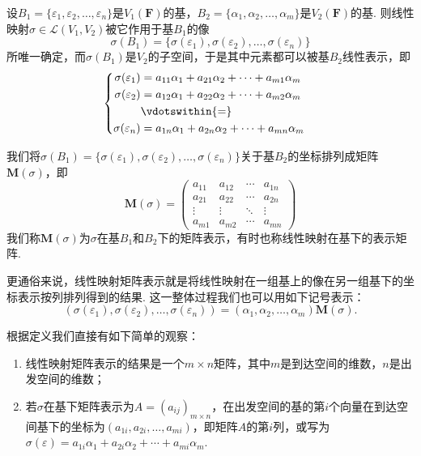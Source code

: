 \begin{definition}\label{def:7:线性映射矩阵表示}
    设$B_1=\{\varepsilon_1,\varepsilon_2,\ldots,\varepsilon_n\}$是$V_1(\mathbf{F})$的基，$B_2=\{\alpha_1,\alpha_2,\ldots,\alpha_m\}$是$V_2(\mathbf{F})$的基. 则线性映射$\sigma \in \mathcal{L}(V_1,V_2)$被它作用于基$B_1$的像
    \[\sigma(B_1)=\{\sigma(\varepsilon_1),\sigma(\varepsilon_2),\ldots,\sigma(\varepsilon_n)\}\]
    所唯一确定，而$\sigma(B_1)$是$V_2$的子空间，于是其中元素都可以被基$B_2$线性表示，即
    \[ \begin{cases} \begin{aligned}
                \sigma(\varepsilon_1) & = a_{11}\alpha_1+a_{21}\alpha_2+\cdots+a_{m1}\alpha_m \\
                \sigma(\varepsilon_2) & = a_{12}\alpha_1+a_{22}\alpha_2+\cdots+a_{m2}\alpha_m \\
                                      & \vdotswithin{=}                                       \\
                \sigma(\varepsilon_n) & = a_{1n}\alpha_1+a_{2n}\alpha_2+\cdots+a_{mn}\alpha_m
            \end{aligned} \end{cases} \]

    我们将$\sigma(B_1)=\{\sigma(\varepsilon_1),\sigma(\varepsilon_2),\ldots,\sigma(\varepsilon_n)\}$关于基$B_2$的坐标排列成矩阵$\mathbf{M}(\sigma)$，即
    \[\mathbf{M}(\sigma)=\begin{pmatrix}
            a_{11} & a_{12} & \cdots & a_{1n} \\
            a_{21} & a_{22} & \cdots & a_{2n} \\
            \vdots & \vdots & \ddots & \vdots \\
            a_{m1} & a_{m2} & \cdots & a_{mn}
        \end{pmatrix}\]
    我们称$\mathbf{M}(\sigma)$为$\sigma$在基$B_1$和$B_2$下的矩阵表示，有时也称线性映射在基下的表示矩阵.
\end{definition}

更通俗来说，线性映射矩阵表示就是将线性映射在一组基上的像在另一组基下的坐标表示按列排列得到的结果. 这一整体过程我们也可以用如下记号表示：
\begin{equation}\label{eq:7:线性映射矩阵表示}
    (\sigma(\varepsilon_1),\sigma(\varepsilon_2),\ldots,\sigma(\varepsilon_n))=(\alpha_1,\alpha_2,\ldots,\alpha_m)\mathbf{M}(\sigma).
\end{equation}

根据定义我们直接有如下简单的观察：
\begin{enumerate}
    \item 线性映射矩阵表示的结果是一个$m\times n$矩阵，其中$m$是到达空间的维数，$n$是出发空间的维数；

    \item 若$\sigma$在基下矩阵表示为$A=(a_{ij})_{m\times n}$，在出发空间的基的第$i$个向量在到达空间基下的坐标为$(a_{1i},a_{2i},\ldots,a_{mi})$，即矩阵$A$的第$i$列，或写为$\sigma(\varepsilon)=a_{1i}\alpha_1+a_{2i}\alpha_2+\cdots+a_{mi}\alpha_m$.
\end{enumerate}

